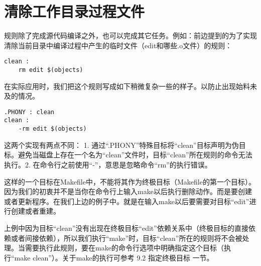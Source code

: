 \section{清除工作目录过程文件}

规则除了完成源代码编译之外，也可以完成其它任务。例如：前边提到的为了实现清除当前目录中编译过程中产生的临时文件（edit和哪些.o文件）的规则：
\begin{Verbatim}[]
clean :
    rm edit $(objects)
\end{Verbatim}
在实际应用时，我们把这个规则写成如下稍微复杂一些的样子。以防止出现始料未及的情况。
\begin{Verbatim}[]
.PHONY : clean
clean :
    -rm edit $(objects)
\end{Verbatim}

这两个实现有两点不同： 1. 通过“.PHONY”特殊目标将“clean”目标声明为伪目标。避免当磁盘上存在一个名为“clean”文件时，目标“clean”所在规则的命令无法执行。2. 在命令行之前使用“-”，意思是忽略命令“rm”的执行错误。

这样的一个目标在Makefile中，不能将其作为终极目标（Makefile的第一个目标）。因为我们的初衷并不是当你在命令行上输入make以后执行删除动作。而是要创建或者更新程序。在我们上边的例子中。就是在输入make以后要需要对目标“edit”进行创建或者重建。

上例中因为目标“clean”没有出现在终极目标“edit”依赖关系中（终极目标的直接依赖或者间接依赖），所以我们执行“make”时，目标“clean”所在的规则将不会被处理。当需要执行此规则，要在make的命令行选项中明确指定这个目标（执行“make clean”）。关于make的执行可参考 9.2 指定终极目标 一节。
